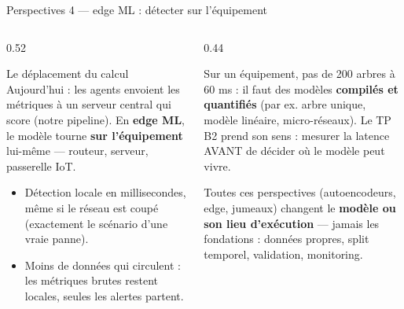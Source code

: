 \begin{frame}{Perspectives 4 --- edge ML : détecter sur l'équipement}
\small
\begin{columns}[t]
\begin{column}{0.52\textwidth}
\begin{block}{Le déplacement du calcul}
Aujourd'hui : les agents envoient les métriques à un serveur central qui
score (notre pipeline). En \textbf{edge ML}, le modèle tourne
\textbf{sur l'équipement} lui-même --- routeur, serveur, passerelle IoT.
\begin{itemize}
\item Détection locale en millisecondes, même si le réseau est coupé
(exactement le scénario d'une vraie panne).
\item Moins de données qui circulent : les métriques brutes restent locales,
seules les alertes partent.
\end{itemize}
\end{block}
\end{column}
\begin{column}{0.44\textwidth}
\begin{wbox}
Sur un équipement, pas de 200 arbres à 60 ms : il faut des modèles
\textbf{compilés et quantifiés} (par ex. arbre unique, modèle linéaire,
micro-réseaux). Le TP B2 prend son sens : mesurer la latence AVANT de
décider où le modèle peut vivre.
\end{wbox}
\begin{kbox}
Toutes ces perspectives (autoencodeurs, edge, jumeaux) changent le
\textbf{modèle ou son lieu d'exécution} --- jamais les fondations :
données propres, split temporel, validation, monitoring.
\end{kbox}
\end{column}
\end{columns}
\end{frame}

